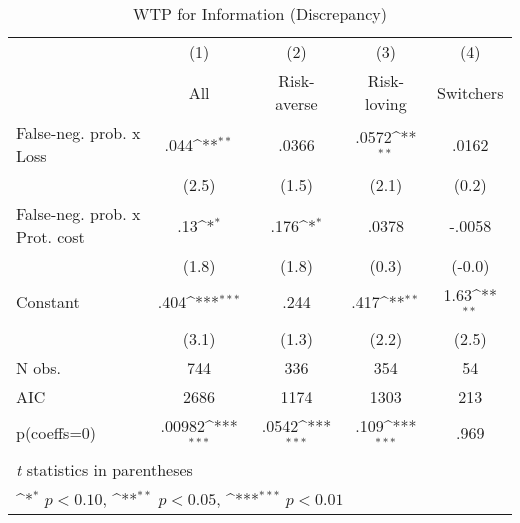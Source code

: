 \begin{table}[htbp]\centering
\def\sym#1{\ifmmode^{#1}\else\(^{#1}\)\fi}
\caption{WTP for Information (Discrepancy)}
\begin{tabular}{l*{4}{c}}
\hline\hline
                &\multicolumn{1}{c}{(1)}&\multicolumn{1}{c}{(2)}&\multicolumn{1}{c}{(3)}&\multicolumn{1}{c}{(4)}\\
                &\multicolumn{1}{c}{All}&\multicolumn{1}{c}{Risk-averse}&\multicolumn{1}{c}{Risk-loving}&\multicolumn{1}{c}{Switchers}\\
\hline
False-neg. prob. x Loss&     .044\sym{**} &    .0366         &    .0572\sym{**} &    .0162         \\
                &    (2.5)         &    (1.5)         &    (2.1)         &    (0.2)         \\
False-neg. prob. x Prot. cost&      .13\sym{*}  &     .176\sym{*}  &    .0378         &   -.0058         \\
                &    (1.8)         &    (1.8)         &    (0.3)         &   (-0.0)         \\
Constant        &     .404\sym{***}&     .244         &     .417\sym{**} &     1.63\sym{**} \\
                &    (3.1)         &    (1.3)         &    (2.2)         &    (2.5)         \\
\hline
N obs.          &      744         &      336         &      354         &       54         \\
AIC             &     2686         &     1174         &     1303         &      213         \\
p(coeffs=0)     &   .00982\sym{***}&    .0542\sym{***}&     .109\sym{***}&     .969         \\
\hline\hline
\multicolumn{5}{l}{\footnotesize \textit{t} statistics in parentheses}\\
\multicolumn{5}{l}{\footnotesize \sym{*} \(p<0.10\), \sym{**} \(p<0.05\), \sym{***} \(p<0.01\)}\\
\end{tabular}
\end{table}
